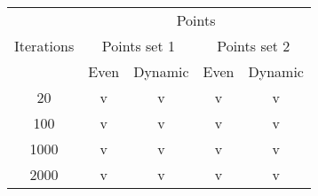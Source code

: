 \begin{center}
	\begin{tabular}{|c|c|c|c|c|}
		\hline
		\multirow{3}{*}{Iterations}	&	\multicolumn{4}{c|}{Points}	\\
										\cline{2-5}
									&	\multicolumn{2}{c|}{Points set 1}	& \multicolumn{2}{c|}{Points set 2} \\
										\cline{2-5}
									&	Even			&	Dynamic			&	Even			&	Dynamic		\\
		\hline
		20							&	v				&	v				&	v				&	v			\\
		\hline
		100							&	v				&	v				&	v				&	v			\\
		\hline
		1000						&	v				&	v				&	v				&	v			\\
		\hline
		2000						&	v				&	v				&	v				&	v			\\
		\hline
	\end{tabular}
	\label{tab:selection_type}
\end{center}
